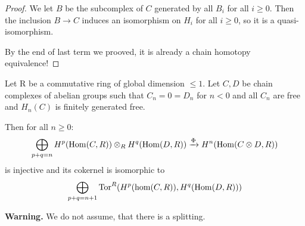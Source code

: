 \documentclass[language=english]{TemplateLecture}
\begin{document}
\begin{proof}
    We let \(B\) be the subcomplex of \(C\) generated by all \(B_i\) for all \(i \geq 0\). Then the inclusion \(B \to C\) induces an isomorphism on \(H_i\) for all \( i \geq 0\), so it is a quasi-isomorphism.

    By the end of last term we prooved, it is already a chain homotopy equivalence!
\end{proof}




\begin{corollary}
    Let R be a commutative ring of global dimension \(\leq 1\). Let \(C,D\) be chain complexes of abelian groups such that \(C_n = 0 = D_n\) for \(n < 0\) and all \(C_n\) are free and \(H_n(C)\) is finitely generated free.

    Then for all \(n \geq 0\):
    \[\bigoplus_{p+q = n} H^p(\operatorname{Hom}(C,R)) \otimes_R H^q(\operatorname{Hom}(D,R)) \xrightarrow{\Phi} H^n(\operatorname{Hom}(C\otimes D, R))\]
    is injective and its cokernel is isomorphic to
    \[\bigoplus_{p+q = n+1} \mathrm{Tor}^R(H^p(\hom(C, R)), H^q(\operatorname{Hom}(D,R)))\]
\end{corollary}

\textbf{Warning.} We do not assume, that there is a splitting.
\end{document}
